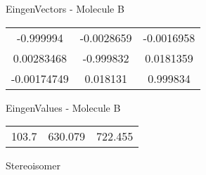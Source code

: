 \begin{multicols}{2}
\begin{center}
\vtab
 EingenVectors - Molecule B     \\
\vtab
\begin{tabular}{|c c c|}
-0.999994	 & 	-0.0028659	 & 	-0.0016958	 \\
0.00283468	 & 	-0.999832	 & 	0.0181359	 \\
-0.00174749	 & 	0.018131	 & 	0.999834
\end{tabular}

\vtab
 EingenValues - Molecule B     \\
\vtab
\begin{tabular}{|c c c|}
103.7	 & 	630.079	 & 	722.455	 \\
\end{tabular}

\end{center}
\end{multicols}
\begin{center}
\vtab
\vtab
\textcolor{NavyBlue}{\Large Stereoisomer}
\end{center}

 \newpage

